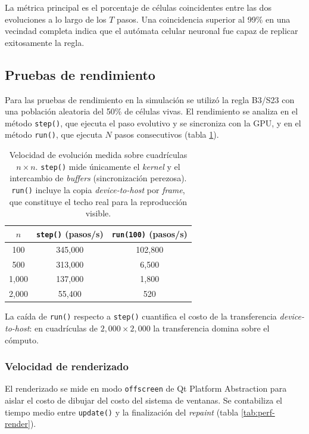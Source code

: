 La métrica principal es el porcentaje de células coincidentes entre las dos evoluciones a lo largo de los $T$ pasos. Una coincidencia superior al 99\% en una vecindad completa indica que el autómata celular neuronal fue capaz de replicar exitosamente la regla.

\subsection{Pruebas de rendimiento}

Para las pruebas de rendimiento en la simulación se utilizó la regla B3/S23 con una población aleatoria del 50\% de células vivas. El rendimiento se analiza en el método \texttt{step()}, que ejecuta el paso evolutivo y se sincroniza con la GPU, y en el método \texttt{run()}, que ejecuta $N$ pasos consecutivos (tabla \ref{tab:perf-evolucion}).

\begin{table}[H]
    \centering
    \begin{tabular}{c|c|c}
        \hline
        $n$ & \texttt{step()} (pasos/s) & \texttt{run(100)} (pasos/s) \\ \hline
        100  & 345,000 & 102,800 \\ \hline
        500  & 313,000 &   6,500 \\ \hline
        1,000 & 137,000 &   1,800 \\ \hline
        2,000 &  55,400 &     520  \\ \hline
    \end{tabular}
    \caption{Velocidad de evolución medida sobre cuadrículas $n \times n$. \texttt{step()} mide únicamente el \textit{kernel} y el intercambio de \textit{buffers} (sincronización perezosa). \texttt{run()} incluye la copia \textit{device-to-host} por \textit{frame}, que constituye el techo real para la reproducción visible.}
    \label{tab:perf-evolucion}
\end{table}

La caída de \texttt{run()} respecto a \texttt{step()} cuantifica el costo de la transferencia \textit{device-to-host}: en cuadrículas de $2{,}000 \times 2{,}000$ la transferencia domina sobre el cómputo.

\subsubsection{Velocidad de renderizado}

El renderizado se mide en modo \texttt{offscreen} de Qt Platform Abstraction para aislar el costo de dibujar del costo del sistema de ventanas. Se contabiliza el tiempo medio entre \texttt{update()} y la finalización del \textit{repaint} (tabla \ref{tab:perf-render}).

